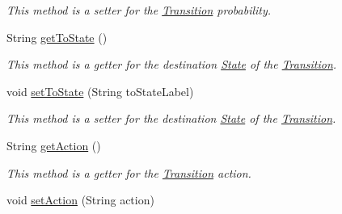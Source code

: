 \begin{DoxyCompactItemize}
\begin{DoxyCompactList}\small\item\em This method is a setter for the \hyperlink{classese_1_1seas_1_1upenn_1_1edu_1_1_transition}{Transition} probability. \end{DoxyCompactList}\item 
\hypertarget{classese_1_1seas_1_1upenn_1_1edu_1_1_transition_a8adc065ffa3b2d59144f3e1bc5334159}{}String \hyperlink{classese_1_1seas_1_1upenn_1_1edu_1_1_transition_a8adc065ffa3b2d59144f3e1bc5334159}{get\+To\+State} ()\label{classese_1_1seas_1_1upenn_1_1edu_1_1_transition_a8adc065ffa3b2d59144f3e1bc5334159}

\begin{DoxyCompactList}\small\item\em This method is a getter for the destination \hyperlink{classese_1_1seas_1_1upenn_1_1edu_1_1_state}{State} of the \hyperlink{classese_1_1seas_1_1upenn_1_1edu_1_1_transition}{Transition}. \end{DoxyCompactList}\item 
\hypertarget{classese_1_1seas_1_1upenn_1_1edu_1_1_transition_a709ce1be87d6954becff885bfea20dea}{}void \hyperlink{classese_1_1seas_1_1upenn_1_1edu_1_1_transition_a709ce1be87d6954becff885bfea20dea}{set\+To\+State} (String to\+State\+Label)\label{classese_1_1seas_1_1upenn_1_1edu_1_1_transition_a709ce1be87d6954becff885bfea20dea}

\begin{DoxyCompactList}\small\item\em This method is a setter for the destination \hyperlink{classese_1_1seas_1_1upenn_1_1edu_1_1_state}{State} of the \hyperlink{classese_1_1seas_1_1upenn_1_1edu_1_1_transition}{Transition}. \end{DoxyCompactList}\item 
\hypertarget{classese_1_1seas_1_1upenn_1_1edu_1_1_transition_a1cbeb959023673cae243d638c0434844}{}String \hyperlink{classese_1_1seas_1_1upenn_1_1edu_1_1_transition_a1cbeb959023673cae243d638c0434844}{get\+Action} ()\label{classese_1_1seas_1_1upenn_1_1edu_1_1_transition_a1cbeb959023673cae243d638c0434844}

\begin{DoxyCompactList}\small\item\em This method is a getter for the \hyperlink{classese_1_1seas_1_1upenn_1_1edu_1_1_transition}{Transition} action. \end{DoxyCompactList}\item 
\hypertarget{classese_1_1seas_1_1upenn_1_1edu_1_1_transition_aaa5a6e03b91e1a64bc5060e64ef49e5d}{}void \hyperlink{classese_1_1seas_1_1upenn_1_1edu_1_1_transition_aaa5a6e03b91e1a64bc5060e64ef49e5d}{set\+Action} (String action)\label{classese_1_1seas_1_1upenn_1_1edu_1_1_transition_aaa5a6e03b91e1a64bc5060e64ef49e5d}


\end{DoxyCompactItemize}
